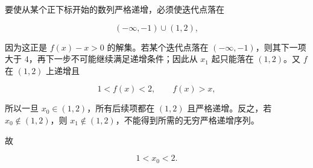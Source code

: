 \begin{answer}
要使从某个正下标开始的数列严格递增，必须使迭代点落在

\nopagebreak[4]
\[
(-\infty,-1)\cup(1,2),
\]

因为这正是 $f(x)-x>0$ 的解集。若某个迭代点落在 $(-\infty,-1)$，则其下一项大于 $4$，再下一步不可能继续满足递增条件；因此从 $x_1$ 起只能落在 $(1,2)$。又 $f$ 在 $(1,2)$ 上递增且

\nopagebreak[4]
\[
1<f(x)<2,\qquad f(x)>x,
\]

所以一旦 $x_0\in(1,2)$，所有后续项都在 $(1,2)$ 且严格递增。反之，若 $x_0\notin(1,2)$，则 $x_1\notin(1,2)$，不能得到所需的无穷严格递增序列。

故

\nopagebreak[4]
\[
1<x_0<2.
\]




\end{answer}